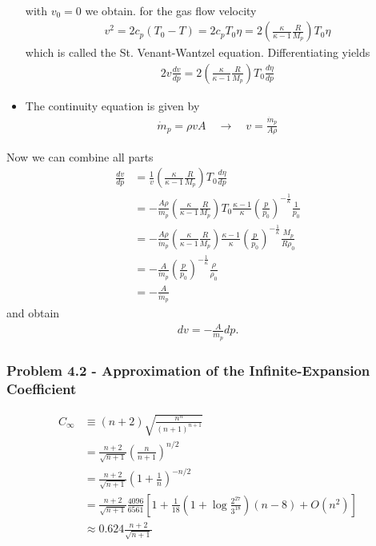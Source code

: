 \documentclass[10pt,a4paper]{article}
\theoremstyle{definition}
\begin{document}
\begin{itemize}
\begin{align}
\end{align}
with $v_0=0$ we obtain. for the gas flow velocity
\begin{align}
    v^2=2c_p(T_0-T)=2c_pT_0\eta=2\left(\frac{\kappa}{\kappa-1}\frac{R}{M_p}\right)T_0\eta
\end{align}
which is called the St. Venant-Wantzel equation. Differentiating yields
\begin{align}
2v\frac{dv}{dp}=2\left(\frac{\kappa}{\kappa-1}\frac{R}{M_p}\right)T_0\frac{d\eta}{dp}
\end{align}
\item The continuity equation is given by
\begin{align}
    \dot m_p=\rho vA\quad\rightarrow\quad v=\frac{\dot m_p}{A\rho}
\end{align}
\end{itemize}
Now we can combine all parts
\begin{align}
    \frac{dv}{dp}
    &=\frac{1}{v}\left(\frac{\kappa}{\kappa-1}\frac{R}{M_p}\right)T_0\frac{d\eta}{dp}\\
    &=-\frac{A\rho}{\dot m_p}\left(\frac{\kappa}{\kappa-1}\frac{R}{M_p}\right)T_0\frac{\kappa-1}{\kappa}\left(\frac{p}{p_0}\right)^{-\frac{1}{\kappa}}\frac{1}{p_0}\\
    &=-\frac{A\rho}{\dot m_p}\left(\frac{\kappa}{\kappa-1}\frac{R}{M_p}\right)\frac{\kappa-1}{\kappa}\left(\frac{p}{p_0}\right)^{-\frac{1}{\kappa}}\frac{M_p}{R\rho_0}\\
    &=-\frac{A}{\dot m_p}\left(\frac{p}{p_0}\right)^{-\frac{1}{\kappa}}\frac{\rho}{\rho_0}\\
    &=-\frac{A}{\dot m_p}
\end{align}
and obtain
\begin{align}
    dv=-\frac{A}{\dot m_p}dp.
\end{align}

\subsubsection{Problem 4.2 - Approximation of the Infinite-Expansion Coefficient}
\begin{align}
    C_\infty&\equiv(n+2)\sqrt{\frac{n^n}{(n+1)^{n+1}}}\\
    &=\frac{n+2}{\sqrt{n+1}}\left(\frac{n}{n+1}\right)^{n/2}\\
    &=\frac{n+2}{\sqrt{n+1}}\left(1+\frac{1}{n}\right)^{-n/2}\\
    &=\frac{n+2}{\sqrt{n+1}}\frac{4096}{6561}\left[1+\frac{1}{18}\left(1+\log\frac{2^{27}}{3^{18}}\right)(n-8) +O\left(n^2\right)\right]\\
    &\approx 0.624 \frac{n+2}{\sqrt{n+1}}
\end{align}
\end{document}
